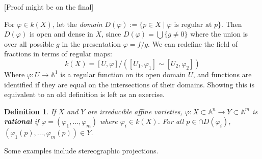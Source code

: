 \documentclass[12pt]{article}
\newcommand{\A}{\mathbb{A}}
\renewcommand{\phi}{\varphi}
\newtheorem{definition}{Definition}[section]
\begin{document}
    [Proof might be on the final]\par 
    For $\phi \in k(X)$, let the \textit{domain} $D(\phi) := \{p \in X \mid \phi \text{ is regular at } p \}$. Then $D(\phi)$ is open and dense in $X$, since $D(\phi) = \bigcup \{g \neq 0\}$ where the union is over all possible $g$ in the presentation $\phi = f/g$. We can redefine the field of fractions in terms of regular maps: 
    $$k(X) = [U, \phi]/([U_1, \phi_1] \sim [U_2, \phi_2])$$
    Where $\phi: U \to \A^1$ is a regular function on its open domain $U$, and functions are identified if they are equal on the intersections of their domains. Showing this is equivalent to an old definition is left as an exercise. \par 
    \begin{definition}
        If $X$ and $Y$ are irreducible affine varieties, $\phi: X \subset \A^n \to Y \subset \A^m$ is \textbf{rational} if $\phi = (\phi_1, \dots, \phi_m)$ where $\phi_i \in k(X)$. For all $p \in \cap D(\phi_i)$, $(\phi_1(p), \dots, \phi_m(p)) \in Y$.
    \end{definition}
    Some examples include stereographic projections. 
\end{document}
